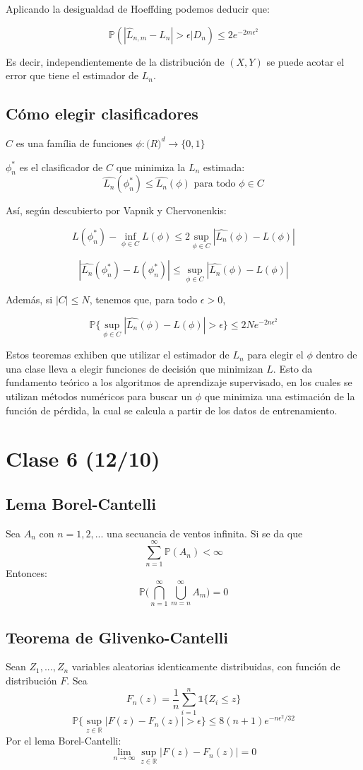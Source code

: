 \documentclass[12pt, a4paper]{article}
\begin{document}
Aplicando la desigualdad de Hoeffding podemos deducir que:

$$ \mathds{P}(|\widehat{L}_{n,m}-L_n|>\epsilon | D_n) \leq 2e^{-2m\epsilon^2} $$

Es decir, independientemente de la distribución de $(X,Y)$ se puede acotar el error que tiene el estimador de $L_n$.
\subsection{Cómo elegir clasificadores}

$C$ es una família de funciones $\phi:\mathds(R)^d \rightarrow \{0,1\}$

$\phi^{*}_n$ es el clasificador de $C$ que minimiza la $L_n$ estimada: $$ \widehat{L_n}(\phi^{*}_n) \leq \widehat{L_n}(\phi) \text{ para todo } \phi \in C$$

Así, según descubierto por Vapnik y Chervonenkis:

$$L(\phi^{*}_n)-\mathop{inf}_{\phi \in C}L(\phi) \leq 2 \mathop{sup}_{\phi \in C} |\widehat{L_n}(\phi) - L(\phi)|$$

$$|\widehat{L_n}(\phi^{*}_n) - L(\phi^{*}_n)| \leq \mathop{sup}_{\phi \in C} |\widehat{L_n}(\phi) - L(\phi)|$$

Además, si $|C| \leq N$, tenemos que, para todo $\epsilon > 0$,

$$ \mathds{P} \bigg \{ \mathop{sup}_{\phi \in C} |\widehat{L_n}(\phi) - L(\phi)|>\epsilon \bigg \} \leq 2Ne^{-2n\epsilon^2} $$

Estos teoremas exhiben que utilizar el estimador de $L_n$ para elegir el $\phi$ dentro de una clase lleva a elegir funciones de decisión que minimizan $L$. Esto da fundamento teórico a los algoritmos de aprendizaje supervisado, en los cuales se utilizan métodos numéricos para buscar un $\phi$ que minimiza una estimación de la función de pérdida, la cual se calcula a partir de los datos de entrenamiento.
\section{Clase 6 (12/10)}
\subsection{Lema Borel-Cantelli}
Sea $A_n$ con $n=1,2,...$ una secuancia de ventos infinita.
Si se da que $$ \sum_{n=1}^{\infty} \mathds{P}(A_n) < \infty $$
Entonces: $$ \mathds{P}\big( \bigcap_{n=1}^{\infty} \bigcup_{m=n}^{\infty} A_m \big)=0 $$
\subsection{Teorema de Glivenko-Cantelli}
Sean $Z_1, ..., Z_n$ variables aleatorias identicamente distribuidas, con función de distribución $F$. Sea 
$$F_n(z)=\frac{1}{n} \sum_{i=1}^n \mathds{1} \{ Z_i \leq z \}$$
$$ \mathds{P} \bigg \{ \mathop{sup}_{z \in \mathds{R}} |F(z)-F_n(z)|>\epsilon \bigg \} \leq 8(n+1)e^{-n\epsilon^2/32}$$
Por el lema Borel-Cantelli:
$$ \mathop{lim}_{n \rightarrow \infty} \mathop{sup}_{z \in \mathds{R}} |F(z)-F_n(z)|=0 $$
\end{document}
